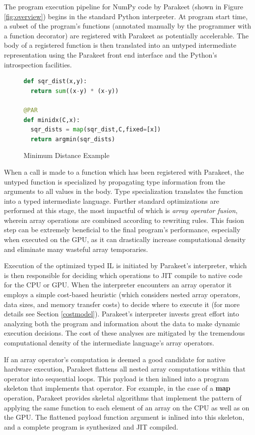 \documentclass[10pt,twocolumn]{article}
\begin{document}
The program execution pipeline for NumPy code by Parakeet (shown in Figure \ref{fig:overview}) begins in the standard Python interpreter. At program start time, a subset of the program's functions (annotated manually by the programmer with a function decorator) are registered with Parakeet as potentially accelerable. The body of a registered function is then translated into an untyped intermediate representation using the Parakeet front end interface and the Python's introspection facilities.

\begin{figure}[h!]
\begin{lstlisting}[numbers=none,language=Python,frame=single]
def sqr_dist(x,y):
  return sum((x-y) * (x-y))

@PAR
def minidx(C,x):
  sqr_dists = map(sqr_dist,C,fixed=[x])
  return argmin(sqr_dists)
\end{lstlisting}
\caption{Minimum Distance Example}
\label{MinIdx}
\end{figure}

When a call is made to a function which has been registered with Parakeet, the untyped function is specialized by propagating type information from the arguments to all values in the body.  Type specialization translates the function into a typed intermediate language. Further standard optimizations are performed at this stage, the most impactful of which is \emph{array operator fusion}, wherein array operations are combined according to rewriting rules. This fusion step can be extremely beneficial to the final program's performance, especially when executed on the GPU, as it can drastically increase computational density and eliminate many wasteful array temporaries.

Execution of the optimized typed IL is initiated by Parakeet's interpreter, which is then responsible for deciding which operations to JIT compile to native code for the CPU or GPU. When the interpreter encounters an array operator it employs a simple cost-based heuristic (which considers nested array operators, data sizes, and memory transfer costs) to decide where to execute it (for more details see Section \ref{costmodel}). Parakeet's interpreter invests great effort into analyzing both the program and information about the data to make dynamic execution decisions. The cost of these analyses are mitigated by the tremendous computational density of the intermediate language's array operators.

If an array operator's computation is deemed a good candidate for native hardware execution, Parakeet flattens all nested array computations within that operator into sequential loops.  This payload is then inlined into a program skeleton that implements that operator.  For example, in the case of a \textbf{map} operation, Parakeet provides skeletal algorithms that implement the pattern of applying the same function to each element of an array on the CPU as well as on the GPU.  The flattened payload function argument is inlined into this skeleton, and a complete program is synthesized and JIT compiled.
\end{document}
